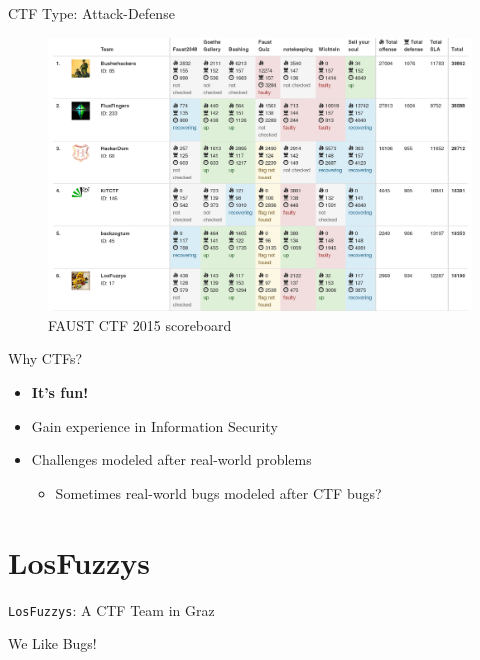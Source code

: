 \begin{frame}
  {CTF Type: Attack-Defense}

  \begin{figure}[h]
    \centering
    \includegraphics[width=\textwidth]{./images/faustctf-scoreboard.png}
    \caption{\footnotesize{}FAUST CTF 2015 scoreboard}
    \label{fig:faustctfscoreboard}
  \end{figure}

\end{frame}


\begin{frame}
  {Why CTFs?}

  \begin{itemize}
    \item \textbf{It's fun!}
    \item Gain experience in Information Security
    \item Challenges modeled after real-world problems
      \begin{itemize}
        \item Sometimes real-world bugs modeled after CTF bugs?
      \end{itemize}
  \end{itemize}
\end{frame}

\section{LosFuzzys}

{
\begin{frame}

  {\huge
    \texttt{LosFuzzys}: A CTF Team in Graz}

  \vspace{19em}

  {\Large
  We Like Bugs!}

\end{frame}
}

